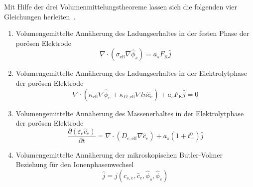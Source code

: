 Mit Hilfe der drei Volumenmittelungstheoreme lassen sich die folgenden vier Gleichungen herleiten~\cite{Doyle1995}.
\begin{enumerate}
    \item Volumengemittelte Annäherung des Ladungserhaltes in der festen Phase der porösen Elektrode
    \begin{equation}
        \nabla \cdot \left(\sigma_{\text{eff}} \nabla \hat{\phi}_{s} \right) = a_s F_{\text{K}} \hat{j}
    \end{equation}
    \item Volumengemittelte Annäherung des Ladungserhaltes in der Elektrolytphase der porösen Elektrode
    \begin{equation}
        \nabla \cdot \left(\kappa_{\text{eff}} \nabla \hat{\phi}_e + \kappa_{D, \text{eff}} \nabla ln \hat{c}_e\right) + a_s F_{\text{K}} \hat{j} = 0
    \end{equation}
    \item Volumengemittelte Annäherung des Massenerhaltes in der Elektrolytphase der porösen Elektrode
    \begin{equation}
        \frac{\partial \left(\varepsilon_e \hat{c}_e \right)}{\partial t} = \nabla \cdot \left(D_{e,\text{eff}}\nabla\hat{c}_e\right) + a_s (1+t^0_+) \hat{j}
    \end{equation}
    \item Volumengemittelte Annäherung der mikroskopischen Butler-Volmer Beziehung für den Ionenphasenwechsel
    \begin{equation}
        \hat{j} = j(c_{s,e},\hat{c}_e,\hat{\phi}_s,\hat{\phi}_e)
    \end{equation}
\end{enumerate}

